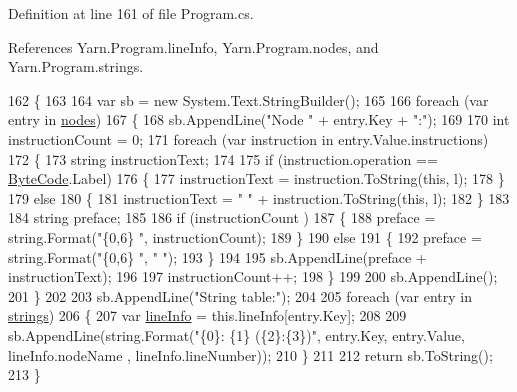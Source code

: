 Definition at line 161 of file Program.\-cs.



References Yarn.\-Program.\-line\-Info, Yarn.\-Program.\-nodes, and Yarn.\-Program.\-strings.


\begin{DoxyCode}
162         \{
163 
164             var sb = \textcolor{keyword}{new} System.Text.StringBuilder();
165 
166             \textcolor{keywordflow}{foreach} (var entry \textcolor{keywordflow}{in} \hyperlink{a00142_a3f4928a577c88263ad016be259b175c4}{nodes})
167             \{
168                 sb.AppendLine(\textcolor{stringliteral}{"Node "} + entry.Key + \textcolor{stringliteral}{":"});
169 
170                 \textcolor{keywordtype}{int} instructionCount = 0;
171                 \textcolor{keywordflow}{foreach} (var instruction \textcolor{keywordflow}{in} entry.Value.instructions)
172                 \{
173                     \textcolor{keywordtype}{string} instructionText;
174 
175                     \textcolor{keywordflow}{if} (instruction.operation == \hyperlink{a00041_ad5dfb6ee68ca7469623ad3e459f98894}{ByteCode}.Label)
176                     \{
177                         instructionText = instruction.ToString(\textcolor{keyword}{this}, l);
178                     \}
179                     \textcolor{keywordflow}{else}
180                     \{
181                         instructionText = \textcolor{stringliteral}{"    "} + instruction.ToString(\textcolor{keyword}{this}, l);
182                     \}
183 
184                     \textcolor{keywordtype}{string} preface;
185 
186                     \textcolor{keywordflow}{if} (instructionCount %
      )
187                     \{
188                         preface = string.Format(\textcolor{stringliteral}{"\{0,6\}   "}, instructionCount);
189                     \}
190                     \textcolor{keywordflow}{else}
191                     \{
192                         preface = string.Format(\textcolor{stringliteral}{"\{0,6\}   "}, \textcolor{stringliteral}{" "});
193                     \}
194 
195                     sb.AppendLine(preface + instructionText);
196 
197                     instructionCount++;
198                 \}
199 
200                 sb.AppendLine();
201             \}
202 
203             sb.AppendLine(\textcolor{stringliteral}{"String table:"});
204 
205             \textcolor{keywordflow}{foreach} (var entry \textcolor{keywordflow}{in} \hyperlink{a00142_a59263e00cecfe36d9881b4c30b048f09}{strings})
206             \{
207                 var \hyperlink{a00142_a0d4da395947767b4a1eaaff8a9842adc}{lineInfo} = this.lineInfo[entry.Key];
208 
209                 sb.AppendLine(string.Format(\textcolor{stringliteral}{"\{0\}: \{1\} (\{2\}:\{3\})"}, entry.Key, entry.Value, lineInfo.nodeName
      , lineInfo.lineNumber));
210             \}
211 
212             \textcolor{keywordflow}{return} sb.ToString();
213         \}
\end{DoxyCode}
